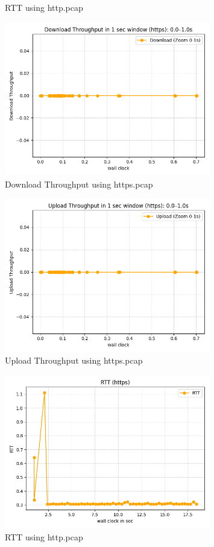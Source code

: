 \documentclass[12pt]{article}
\begin{document}
\begin{enumerate}
\begin{enumerate}
\begin{figure}[h!]
            \caption{RTT using http.pcap}
        \end{figure}
        \begin{figure}[h!]
            \centering
            \includegraphics[width=0.8\textwidth]{down_throughput_s.png}
            \caption{Download Throughput using https.pcap}
        \end{figure}
        \begin{figure}[h!]
            \centering
            \includegraphics[width=0.8\textwidth]{up_throughput_s.png}
            \caption{Upload Throughput using https.pcap}
        \end{figure}
        \begin{figure}[h!]
            \centering
            \includegraphics[width=0.8\textwidth]{rtt_s.png}
            \caption{RTT using http.pcap}
        \end{figure}
    \end{enumerate}
    

\end{enumerate}
\end{document}

